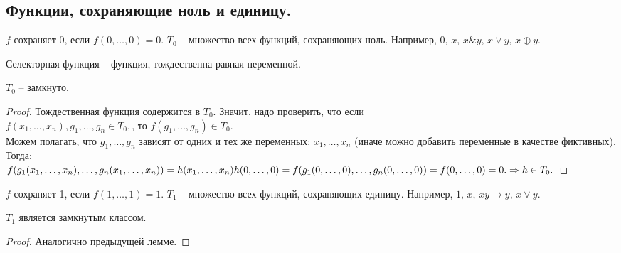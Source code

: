 \subsection{Функции, сохраняющие ноль и единицу. }
\begin{definition}
	$f$ сохраняет 0, если $f(0,\ldots, 0)=0$.
	$T_0$ -- множество всех функций, сохраняющих ноль. Например, $0,\,x,\,x \& y,\, x \vee y,\, x \oplus y$.
\end{definition}
\begin{definition}
	Селекторная функция -- функция, тождественна равная переменной. 
\end{definition}
\begin{lemma}
	$T_0 $ -- замкнуто. 
\end{lemma}
\begin{proof}
	Тождественная функция содержится в $T_0$. Значит, надо проверить, что если  \\
	 $f(x_1,\ldots, x_n),g_1, \ldots, g_n \in T_0, \text{, то~} f(g_1, \ldots, g_n) \in T_0.$ \\
	Можем полагать, что $g_1, \ldots, g_n$ зависят от одних и тех же переменных: $x_1, \ldots, x_n$ (иначе можно добавить переменные в качестве фиктивных). Тогда:\\
	$f(g_1(x_1, \ldots, x_n),\ldots, g_n(x_1, \ldots, x_n))=h(x_1, \ldots, x_n) \\
	h(0, \ldots, 0)=f(g_1(0,\ldots,0),\ldots,g_n(0, \ldots, 0))=f(0,\ldots,0)=0. \Rightarrow h \in T_0. 
$
\end{proof}
\begin{definition}
	$f$ сохраняет 1, если $f(1,\ldots, 1)=1$.
	$T_1$ -- множество всех функций, сохраняющих единицу. Например, $1,\,x,\,xy\rightarrow y, \,x \vee y$.
\end{definition}
\begin{lemma}
	$T_1 $ является замкнутым классом. 
\end{lemma}
\begin{proof}
	Аналогично предыдущей лемме. 
\end{proof}
